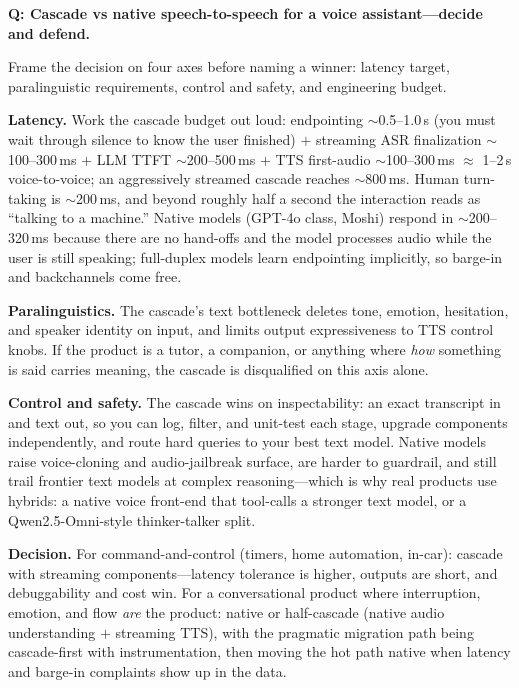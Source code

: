 \begin{interviewq}
\textbf{Q: Cascade vs native speech-to-speech for a voice assistant---decide and defend.}

 \quad {} \quad \badgefreq{\freqmed}

\stronganswer

Frame the decision on four axes before naming a winner: latency target, paralinguistic requirements, control and safety, and engineering budget.

\textbf{Latency.} Work the cascade budget out loud: endpointing $\sim$0.5--1.0\,s (you must wait through silence to know the user finished) $+$ streaming ASR finalization $\sim$100--300\,ms $+$ LLM TTFT $\sim$200--500\,ms $+$ TTS first-audio $\sim$100--300\,ms $\approx$ 1--2\,s voice-to-voice; an aggressively streamed cascade reaches $\sim$800\,ms. Human turn-taking is $\sim$200\,ms, and beyond roughly half a second the interaction reads as ``talking to a machine.'' Native models (GPT-4o class, Moshi) respond in $\sim$200--320\,ms because there are no hand-offs and the model processes audio while the user is still speaking; full-duplex models learn endpointing implicitly, so barge-in and backchannels come free.

\textbf{Paralinguistics.} The cascade's text bottleneck deletes tone, emotion, hesitation, and speaker identity on input, and limits output expressiveness to TTS control knobs. If the product is a tutor, a companion, or anything where \textit{how} something is said carries meaning, the cascade is disqualified on this axis alone.

\textbf{Control and safety.} The cascade wins on inspectability: an exact transcript in and text out, so you can log, filter, and unit-test each stage, upgrade components independently, and route hard queries to your best text model. Native models raise voice-cloning and audio-jailbreak surface, are harder to guardrail, and still trail frontier text models at complex reasoning---which is why real products use hybrids: a native voice front-end that tool-calls a stronger text model, or a Qwen2.5-Omni-style thinker-talker split.

\textbf{Decision.} For command-and-control (timers, home automation, in-car): cascade with streaming components---latency tolerance is higher, outputs are short, and debuggability and cost win. For a conversational product where interruption, emotion, and flow \textit{are} the product: native or half-cascade (native audio understanding $+$ streaming TTS), with the pragmatic migration path being cascade-first with instrumentation, then moving the hot path native when latency and barge-in complaints show up in the data.


\end{interviewq}
